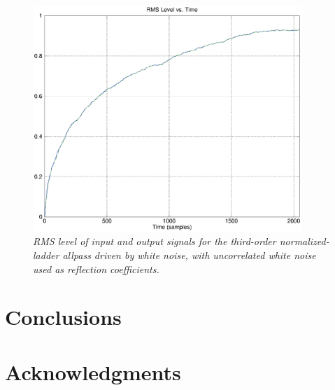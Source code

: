 \documentclass[twoside,a4paper]{article}
\begin{document}
\begin{figure}[ht]
\center
\includegraphics[width=4in]{eps/tapnn2.eps}
\caption{\label{tapnn2}{\it RMS level of input and output signals
for the third-order normalized-ladder allpass driven by white noise,
with uncorrelated white noise used as reflection coefficients.}}
\end{figure} 

\section{Conclusions}

\section{Acknowledgments}

{\small\raggedright
\nocite{*}


}
\end{document}
